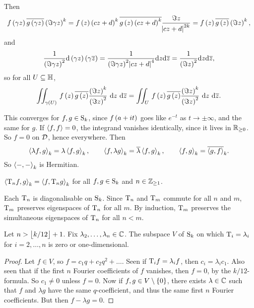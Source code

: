 \pagebreak

Then
$$ f\br{\gamma z}\overline{g\br{\gamma z}}\br{\Im \gamma z}^k = f\br{z}\br{cz + d}^k\overline{g\br{z}\br{cz + d}^k}\dfrac{\Im z}{\abs{cz + d}^{2k}} = f\br{z}\overline{g\br{z}}\br{\Im z}^k, $$
and
$$ \dfrac{1}{\br{\Im \gamma z}^2}\d\br{\gamma z}\br{\gamma \overline{z}} = \dfrac{1}{\br{\Im \gamma z}^2\abs{cz + d}^4}\d z\d\overline{z} = \dfrac{1}{\br{\Im z}^2}\d z\d\overline{z}, $$
so for all $ U \subseteq \HH $,
$$ \iintd{\gamma\br{U}}{f\br{z}\overline{g\br{z}}\dfrac{\br{\Im z}^k}{\br{\Im z}^2}}{z}{\overline{z}} = \iintd{U}{f\br{z}\overline{g\br{z}}\dfrac{\br{\Im z}^k}{\br{\Im z}^2}}{z}{\overline{z}}. $$

\begin{note*}
This converges for $ f, g \in \S_k $, since $ f\br{a + it} $ goes like $ e^{-t} $ as $ t \to \pm\infty $, and the same for $ g $. If $ \abr{f, f} = 0 $, the integrand vanishes identically, since it lives in $ \RR_{\ge 0} $. So $ f = 0 $ on $ \DDD $, hence everywhere. Then
$$ \abr{\lambda f, g}_k = \lambda\abr{f, g}_k, \qquad \abr{f, \lambda g}_k = \overline{\lambda}\abr{f, g}_k, \qquad \abr{f, g}_k = \overline{\abr{g, f}}_k. $$
So $ \abr{-, -}_k $ is Hermitian.
\end{note*}

\begin{theorem}
$ \abr{\T_nf, g}_k = \abr{f, \T_ng}_k $ for all $ f, g \in \S_k $ and $ n \in \ZZ_{\ge 1} $.
\end{theorem}

\begin{corollary}
Each $ \T_n $ is diagonalisable on $ \S_k $. Since $ \T_n $ and $ \T_m $ commute for all $ n $ and $ m $, $ \T_m $ preserves eigenspaces of $ \T_n $ for all $ m $. By induction, $ \T_m $ preserves the simultaneous eigenspaces of $ \T_n $ for all $ n < m $.
\end{corollary}

\begin{proposition}
Let $ n > \fbr{k / 12} + 1 $. Fix $ \lambda_2, \dots, \lambda_n \in \CC $. The subspace $ V $ of $ \S_k $ on which $ \T_i = \lambda_i $ for $ i = 2, \dots, n $ is zero or one-dimensional.
\end{proposition}

\begin{proof}
Let $ f \in V $, so $ f = c_1q + c_2q^2 + \dots $. Seen if $ \T_if = \lambda_if $, then $ c_i = \lambda_ic_1 $. Also seen that if the first $ n $ Fourier coefficients of $ f $ vanishes, then $ f = 0 $, by the $ k / 12 $-formula. So $ c_1 \ne 0 $ unless $ f = 0 $. Now if $ f, g \in V \setminus \cbr{0} $, there exists $ \lambda \in \CC $ such that $ f $ and $ \lambda g $ have the same $ q $-coefficient, and thus the same first $ n $ Fourier coefficients. But then $ f - \lambda g = 0 $.
\end{proof}

